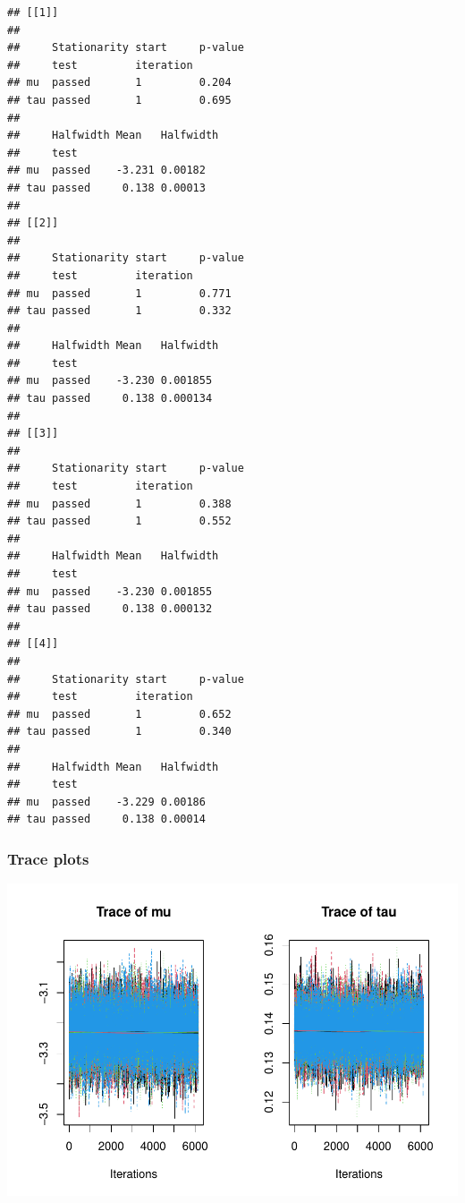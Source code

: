 \documentclass[
  11pt,
]{article}
\begin{document}
\begin{verbatim}
## [[1]]
##                                   
##     Stationarity start     p-value
##     test         iteration        
## mu  passed       1         0.204  
## tau passed       1         0.695  
##                               
##     Halfwidth Mean   Halfwidth
##     test                      
## mu  passed    -3.231 0.00182  
## tau passed     0.138 0.00013  
## 
## [[2]]
##                                   
##     Stationarity start     p-value
##     test         iteration        
## mu  passed       1         0.771  
## tau passed       1         0.332  
##                               
##     Halfwidth Mean   Halfwidth
##     test                      
## mu  passed    -3.230 0.001855 
## tau passed     0.138 0.000134 
## 
## [[3]]
##                                   
##     Stationarity start     p-value
##     test         iteration        
## mu  passed       1         0.388  
## tau passed       1         0.552  
##                               
##     Halfwidth Mean   Halfwidth
##     test                      
## mu  passed    -3.230 0.001855 
## tau passed     0.138 0.000132 
## 
## [[4]]
##                                   
##     Stationarity start     p-value
##     test         iteration        
## mu  passed       1         0.652  
## tau passed       1         0.340  
##                               
##     Halfwidth Mean   Halfwidth
##     test                      
## mu  passed    -3.229 0.00186  
## tau passed     0.138 0.00014
\end{verbatim}

\hypertarget{trace-plots}{%
\subsubsection{Trace plots}\label{trace-plots}}

\includegraphics{03-lec_files/figure-latex/trace-1.pdf}
\end{document}
